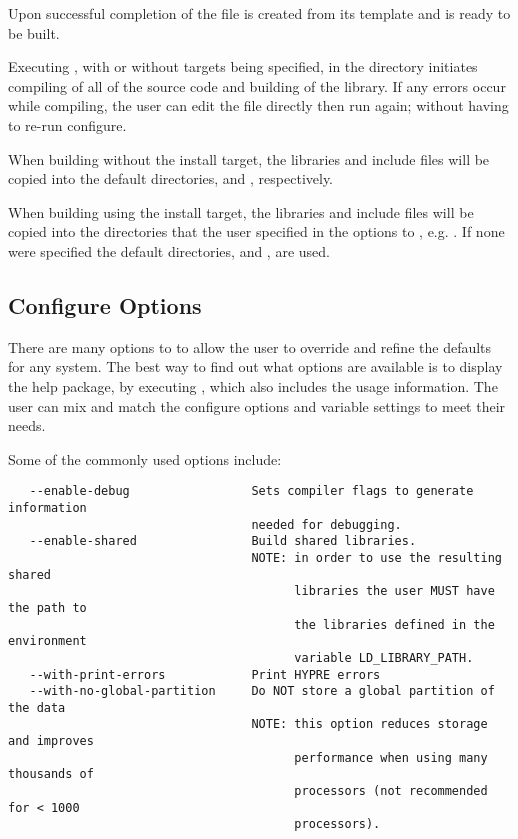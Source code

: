 Upon successful completion of  the file
 is created from its template
 and \hypre{} is ready to be built.

Executing , with or without targets being specified, in the
 directory initiates compiling of all of the source code and building
of the \hypre{} library.  If any errors occur while compiling, the user can edit
the file  directly then run  again;
without having to re-run configure.

When building \hypre{} without the install target, the libraries and include
files will be copied into the default directories,  and
, respectively.

When building \hypre{} using the install target, the libraries and include files
will be copied into the directories that the user specified in the options to
, e.g. .  If none were specified the
default directories,  and , are
used.


\subsection{Configure Options}\label{config_options}

There are many options to  to allow the user to override and
refine the defaults for any system. The best way to find out what options are
available is to display the help package, by executing , which also includes the usage information.  The user can mix and match
the configure options and variable settings to meet their needs.

Some of the commonly used options include:

\begin{verbatim}
   --enable-debug                 Sets compiler flags to generate information 
                                  needed for debugging.
   --enable-shared                Build shared libraries.
                                  NOTE: in order to use the resulting shared 
                                        libraries the user MUST have the path to
                                        the libraries defined in the environment 
                                        variable LD_LIBRARY_PATH. 
   --with-print-errors            Print HYPRE errors
   --with-no-global-partition     Do NOT store a global partition of the data
                                  NOTE: this option reduces storage and improves
                                        performance when using many thousands of
                                        processors (not recommended for < 1000 
                                        processors).


\end{verbatim}


